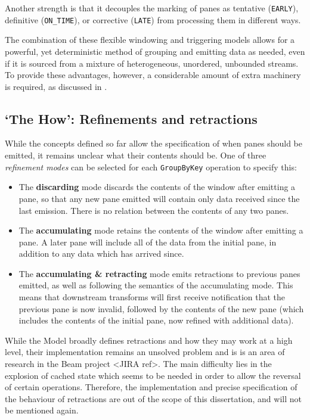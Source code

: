 Another strength is that it decouples the marking of panes as tentative (\verb|EARLY|), definitive (\verb|ON_TIME|), or corrective (\verb|LATE|) from processing them in different ways.

The combination of these flexible windowing and triggering models allows for a powerful, yet deterministic method of grouping and emitting data as needed, even if it is sourced from a mixture of heterogeneous, unordered, unbounded streams.
To provide these advantages, however, a considerable amount of extra machinery is required, as discussed in .

\subsection{`The How': Refinements and retractions}\label{sec:prep:dataflow:how}


While the concepts defined so far allow the specification of when panes should be emitted, it remains unclear what their contents should be.
One of three \emph{refinement modes} can be selected for each \verb|GroupByKey| operation to specify this:
\begin{itemize}
	\item The \textbf{discarding} mode discards the contents of the window after emitting a pane, so that any new pane emitted will contain only data received since the last emission. There is no relation between the contents of any two panes.
	\item The \textbf{accumulating} mode retains the contents of the window after emitting a pane. A later pane will include all of the data from the initial pane, in addition to any data which has arrived since.
	\item The \textbf{accumulating \& retracting} mode emits retractions to previous panes emitted, as well as following the semantics of the accumulating mode. This means that downstream transforms will first receive notification that the previous pane is now invalid, followed by the contents of the new pane (which includes the contents of the initial pane, now refined with additional data). 
\end{itemize}

While the Model broadly defines retractions and how they may work at a high level, their implementation remains an unsolved problem and is is an area of research in the Beam project <JIRA ref>.
The main difficulty lies in the explosion of cached state which seems to be needed in order to allow the reversal of certain operations.
Therefore, the implementation and precise specification of the behaviour of retractions are out of the scope of this dissertation, and will not be mentioned again.

